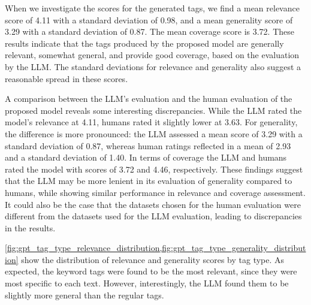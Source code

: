 When we investigate the scores for the generated tags, we find a mean relevance score of 4.11 with a standard deviation of 0.98, and a mean generality score of 3.29 with a standard deviation of 0.87. The mean coverage score is 3.72. These results indicate that the tags produced by the proposed model are generally relevant, somewhat general, and provide good coverage, based on the evaluation by the LLM. The standard deviations for relevance and generality also suggest a reasonable spread in these scores.

A comparison between the LLM's evaluation and the human evaluation of the proposed model reveals some interesting discrepancies. While the LLM rated the model's relevance at 4.11, humans rated it slightly lower at 3.63. For generality, the difference is more pronounced: the LLM assessed a mean score of 3.29 with a standard deviation of 0.87, whereas human ratings reflected in a mean of 2.93 and a standard deviation of 1.40. In terms of coverage the LLM and humans rated the model with scores of 3.72 and 4.46, respectively. These findings suggest that the LLM may be more lenient in its evaluation of generality compared to humans, while showing similar performance in relevance and coverage assessment. It could also be the case that the datasets chosen for the human evaluation were different from the datasets used for the LLM evaluation, leading to discrepancies in the results.




\cref{fig:gpt_tag_type_relevance_distribution,fig:gpt_tag_type_generality_distribution} show the distribution of relevance and generality scores by tag type. As expected, the keyword tags were found to be the most relevant, since they were most specific to each text. However, interestingly, the LLM found them to be slightly more general than the regular tags.

